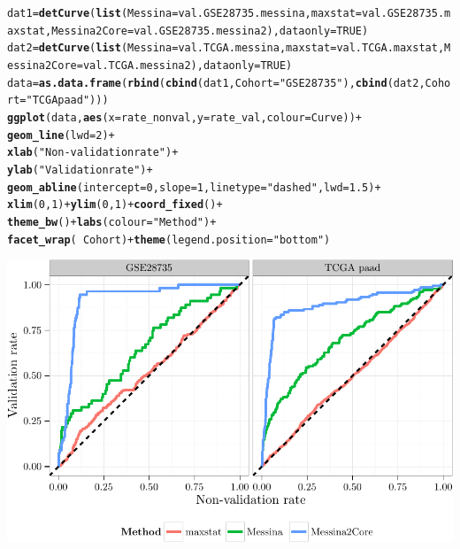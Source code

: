 \documentclass{article}\usepackage[]{graphicx}\usepackage[]{color}
\makeatletter
\def\maxwidth{ %
  \ifdim\Gin@nat@width>\linewidth
    \linewidth
  \else
    \Gin@nat@width
  \fi
}
\newcommand{\hlnum}[1]{\textcolor[rgb]{0.686,0.059,0.569}{#1}}%
\newcommand{\hlstr}[1]{\textcolor[rgb]{0.192,0.494,0.8}{#1}}%
\newcommand{\hlopt}[1]{\textcolor[rgb]{0,0,0}{#1}}%
\newcommand{\hlstd}[1]{\textcolor[rgb]{0.345,0.345,0.345}{#1}}%
\newcommand{\hlkwb}[1]{\textcolor[rgb]{0.69,0.353,0.396}{#1}}%
\newcommand{\hlkwc}[1]{\textcolor[rgb]{0.333,0.667,0.333}{#1}}%
\newcommand{\hlkwd}[1]{\textcolor[rgb]{0.737,0.353,0.396}{\textbf{#1}}}%
\newenvironment{kframe}{%
 \def\at@end@of@kframe{}%
 \ifinner\ifhmode%
  \def\at@end@of@kframe{\end{minipage}}%
  \begin{minipage}{\columnwidth}%
 \fi\fi%
 \def\FrameCommand##1{\hskip\@totalleftmargin \hskip-\fboxsep
 \colorbox{shadecolor}{##1}\hskip-\fboxsep
     \hskip-\linewidth \hskip-\@totalleftmargin \hskip\columnwidth}%
 \MakeFramed {\advance\hsize-\width
   \@totalleftmargin\z@ \linewidth\hsize
   \@setminipage}}%
 {\par\unskip\endMakeFramed%
 \at@end@of@kframe}
\newenvironment{knitrout}{}{} %
\makeatother
\begin{document}
\begin{knitrout}
\begin{kframe}
\begin{alltt}
\hlstd{dat1} \hlkwb{=} \hlkwd{detCurve}\hlstd{(}\hlkwd{list}\hlstd{(}\hlkwc{Messina} \hlstd{= val.GSE28735.messina,} \hlkwc{maxstat} \hlstd{= val.GSE28735.maxstat,} \hlkwc{Messina2Core} \hlstd{= val.GSE28735.messina2),} \hlkwc{dataonly} \hlstd{=} \hlnum{TRUE}\hlstd{)}
\hlstd{dat2} \hlkwb{=} \hlkwd{detCurve}\hlstd{(}\hlkwd{list}\hlstd{(}\hlkwc{Messina} \hlstd{= val.TCGA.messina,} \hlkwc{maxstat} \hlstd{= val.TCGA.maxstat,} \hlkwc{Messina2Core} \hlstd{= val.TCGA.messina2),} \hlkwc{dataonly} \hlstd{=} \hlnum{TRUE}\hlstd{)}
\hlstd{data} \hlkwb{=} \hlkwd{as.data.frame}\hlstd{(}\hlkwd{rbind}\hlstd{(}\hlkwd{cbind}\hlstd{(dat1,} \hlkwc{Cohort} \hlstd{=} \hlstr{"GSE28735"}\hlstd{),} \hlkwd{cbind}\hlstd{(dat2,} \hlkwc{Cohort} \hlstd{=} \hlstr{"TCGA paad"}\hlstd{)))}
\hlkwd{ggplot}\hlstd{(data,} \hlkwd{aes}\hlstd{(}\hlkwc{x} \hlstd{= rate_nonval,} \hlkwc{y} \hlstd{= rate_val,} \hlkwc{colour} \hlstd{= Curve))} \hlopt{+}
        \hlkwd{geom_line}\hlstd{(}\hlkwc{lwd} \hlstd{=} \hlnum{2}\hlstd{)} \hlopt{+}
        \hlkwd{xlab}\hlstd{(}\hlstr{"Non-validation rate"}\hlstd{)} \hlopt{+}
        \hlkwd{ylab}\hlstd{(}\hlstr{"Validation rate"}\hlstd{)} \hlopt{+}
        \hlkwd{geom_abline}\hlstd{(}\hlkwc{intercept} \hlstd{=} \hlnum{0}\hlstd{,} \hlkwc{slope} \hlstd{=} \hlnum{1}\hlstd{,} \hlkwc{linetype} \hlstd{=} \hlstr{"dashed"}\hlstd{,} \hlkwc{lwd} \hlstd{=} \hlnum{1.5}\hlstd{)} \hlopt{+}
        \hlkwd{xlim}\hlstd{(}\hlnum{0}\hlstd{,} \hlnum{1}\hlstd{)} \hlopt{+} \hlkwd{ylim}\hlstd{(}\hlnum{0}\hlstd{,} \hlnum{1}\hlstd{)} \hlopt{+} \hlkwd{coord_fixed}\hlstd{()} \hlopt{+}
        \hlkwd{theme_bw}\hlstd{()} \hlopt{+} \hlkwd{labs}\hlstd{(}\hlkwc{colour} \hlstd{=} \hlstr{"Method"}\hlstd{)} \hlopt{+}
        \hlkwd{facet_wrap}\hlstd{(}\hlopt{~} \hlstd{Cohort)} \hlopt{+} \hlkwd{theme}\hlstd{(}\hlkwc{legend.position} \hlstd{=} \hlstr{"bottom"}\hlstd{)}
\end{alltt}
\end{kframe}

{\centering \includegraphics[width=\maxwidth]{figure/07-E3-E3-val-detcurves-plots-1} 

}



\end{knitrout}
\end{document}
